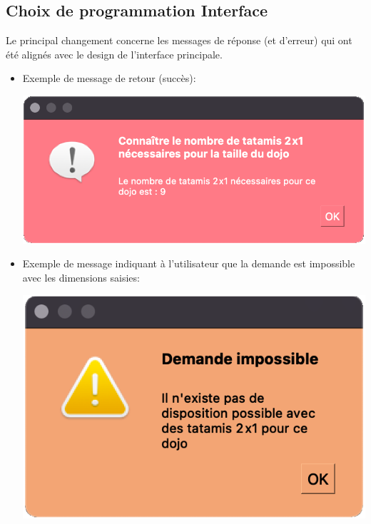 \subsection{Choix de programmation Interface}

Le principal changement concerne les messages de réponse (et d’erreur) qui ont été alignés avec le design de l’interface principale.

\begin{itemize}


    \item Exemple de message de retour (succès):

          \begin{center}
              \includegraphics[scale=0.25]{images/prodRetourSucces.png}
          \end{center}


    \item Exemple de message indiquant à l’utilisateur que la demande est impossible avec les dimensions saisies:

          \begin{center}
              \includegraphics[scale=0.25]{images/prodImpossible.png}
          \end{center}



\end{itemize}
